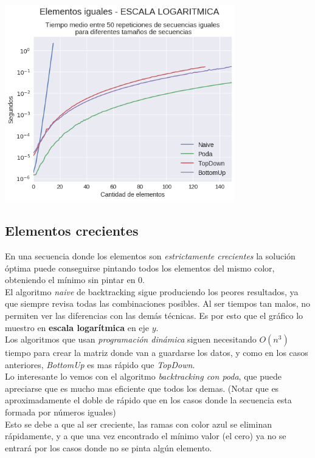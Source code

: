 {\centering
  \includegraphics[width=0.75\textwidth]{informe/img/experimentos/todos-iguales-logaritmica.png} \\
}

\subsection{Elementos crecientes}

En una secuencia donde los elementos son \textit{estrictamente crecientes} la solución óptima puede conseguirse pintando todos los elementos del mismo color, obteniendo el mínimo sin pintar en 0. \\

El algoritmo \textit{naive} de backtracking sigue produciendo los peores resultados, ya que siempre revisa todas las combinaciones posibles. Al ser tiempos tan malos, no permiten ver las diferencias con las demás técnicas. Es por esto que el gráfico lo muestro en \textbf{escala logarítmica} en eje $y$.\\

Los algoritmos que usan \textit{programación dinámica} siguen necesitando $O(n^3)$ tiempo para crear la matriz donde van a guardarse los datos, y como en los casos anteriores, \textit{BottomUp} es mas rápido que \textit{TopDown}. \\

Lo interesante lo vemos con el algoritmo \textit{backtracking con poda}, que puede apreciarse que es mucho mas eficiente que todos los demas. (Notar que es aproximadamente el doble de rápido que en los casos donde la secuencia esta formada por números iguales) \\

Esto se debe a que al ser creciente, las ramas con color azul se eliminan rápidamente, y a que una vez encontrado el mínimo valor (el cero) ya no se entrará por los casos donde no se pinta algún elemento. \\

